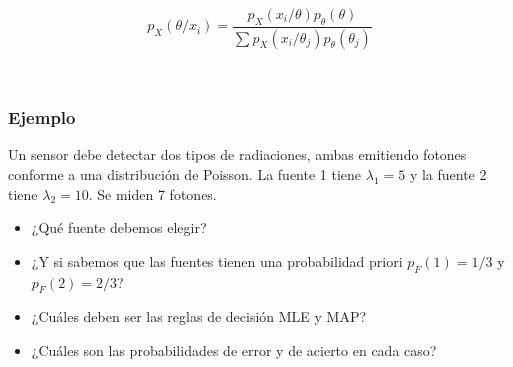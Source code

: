 \documentclass[11pt]{article}
\providecommand{\tightlist}{%
      \setlength{\itemsep}{0pt}\setlength{\parskip}{0pt}}
\begin{document}
\[p_X(\theta/x_i) = \frac{p_X(x_i/\theta)p_\theta(\theta)}{\sum p_X(x_i/\theta_j)p_\theta(\theta_j)}\]

    \begin{center}
    \end{center}
    { \hspace*{\fill} \\}
    
    \hypertarget{ejemplo}{%
\subsubsection*{Ejemplo}\label{ejemplo}}

Un sensor debe detectar dos tipos de radiaciones, ambas emitiendo
fotones conforme a una distribución de Poisson. La fuente 1 tiene
\(\lambda_1 = 5\) y la fuente 2 tiene \(\lambda_2 = 10\). Se miden 7
fotones.

\begin{itemize}
\tightlist
\item
  ¿Qué fuente debemos elegir?
\item
  ¿Y si sabemos que las fuentes tienen una probabilidad priori
  \(p_F(1)=1/3\) y \(p_F(2)=2/3\)?
\item
  ¿Cuáles deben ser las reglas de decisión MLE y MAP?
\item
  ¿Cuáles son las probabilidades de error y de acierto en cada caso?
\end{itemize}


    
    
    
    
\end{document}
